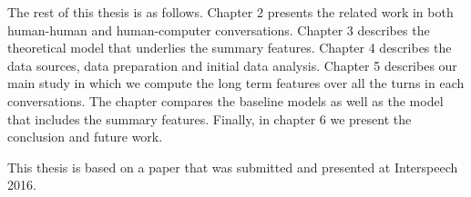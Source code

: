 The rest of this thesis is as follows.  Chapter 2 presents the related work in both human-human and human-computer conversations. Chapter 3 describes the theoretical model that underlies the summary features. Chapter 4 describes the data sources, data preparation and initial data analysis. Chapter 5 describes our main study in which we compute the long term features over all the turns in each conversations. The chapter compares the baseline models as well as the model that includes the summary features. Finally, in chapter 6 we present the conclusion and future work.


This thesis is based on a paper \cite{Meshorer2016UsingPS} that was submitted and presented at Interspeech 2016.


